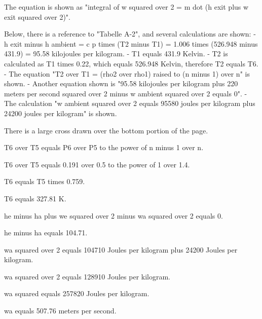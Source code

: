 The equation is shown as "integral of w squared over 2 = m dot (h exit plus w exit squared over 2)". 

Below, there is a reference to "Tabelle A-2", and several calculations are shown:
- h exit minus h ambient = c p times (T2 minus T1) = 1.006 times (526.948 minus 431.9) = 95.58 kilojoules per kilogram.
- T1 equals 431.9 Kelvin.
- T2 is calculated as T1 times 0.22, which equals 526.948 Kelvin, therefore T2 equals T6.
- The equation "T2 over T1 = (rho2 over rho1) raised to (n minus 1) over n" is shown.
- Another equation shown is "95.58 kilojoules per kilogram plus 220 meters per second squared over 2 minus w ambient squared over 2 equals 0".
- The calculation "w ambient squared over 2 equals 95580 joules per kilogram plus 24200 joules per kilogram" is shown.

There is a large cross drawn over the bottom portion of the page.

T6 over T5 equals P6 over P5 to the power of n minus 1 over n.

T6 over T5 equals 0.191 over 0.5 to the power of 1 over 1.4.

T6 equals T5 times 0.759.

T6 equals 327.81 K.

he minus ha plus we squared over 2 minus wa squared over 2 equals 0.

he minus ha equals 104.71.

wa squared over 2 equals 104710 Joules per kilogram plus 24200 Joules per kilogram.

wa squared over 2 equals 128910 Joules per kilogram.

wa squared equals 257820 Joules per kilogram.

wa equals 507.76 meters per second.